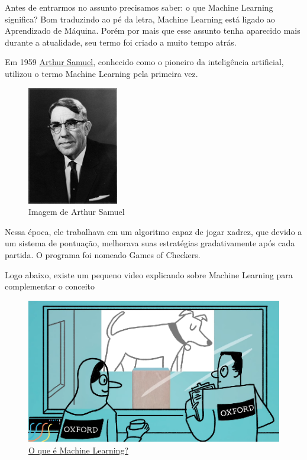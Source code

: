 \documentclass{article}
\begin{document}
    Antes de entrarmos no assunto precisamos saber: o que Machine Learning significa? Bom traduzindo ao pé da letra, Machine Learning está ligado ao Aprendizado de Máquina. Porém por mais que esse 
    assunto tenha aparecido mais durante a atualidade, seu termo foi criado a muito tempo atrás.

    Em 1959 \href{https://en.wikipedia.org/wiki/Arthur_Samuel}{Arthur Samuel}, conhecido como o 
    pioneiro da inteligência artificial, utilizou o termo Machine Learning pela primeira vez. 

    \begin{figure}[htp]
        \centering
        \includegraphics[scale=1]{ArthurSamuel.jpg}
        \caption{Imagem de Arthur Samuel}
    \end{figure}

    Nessa época, ele trabalhava em um algoritmo capaz de jogar xadrez, que devido a um sistema de
    pontuação, melhorava suas estratégias gradativamente após cada partida. O programa foi nomeado
    Games of Checkers.

    Logo abaixo, existe um pequeno video explicando sobre Machine Learning para complementar o conceito

    \begin{figure}[htp]
        \centering
        \includegraphics[scale=0.65]{ML.png}
        \caption{\href{https://youtu.be/pbVwH8o837A}{O que é Machine Learning?}}
    \end{figure}
\end{document}
